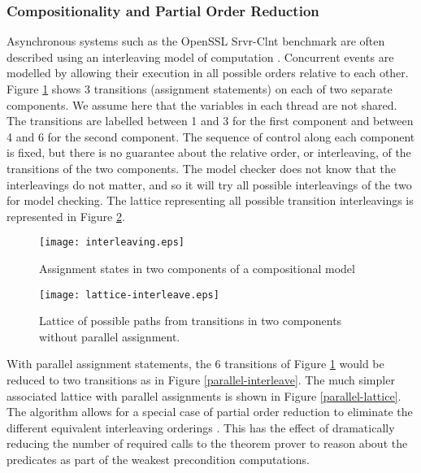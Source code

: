 \subsubsection{Compositionality and Partial Order Reduction}

Asynchronous systems such as the OpenSSL Srvr-Clnt benchmark are often
described using an interleaving model of
computation \cite{modelchecking}. Concurrent events are modelled by
allowing their execution in all possible orders relative to each
other.  Figure \ref{assignment-interleave} shows 3 transitions
(assignment statements) on each of two separate components.  We assume here that the variables in each thread are not shared.  The
transitions are labelled between 1 and 3 for the first component and
between 4 and 6 for the second component.  The sequence of control
along each component is fixed, but there is no guarantee about the
relative order, or interleaving, of the transitions of the two
components.  The model checker does not know that the interleavings do
not matter, and so it will try all possible interleavings of the two
for model checking.  The lattice representing all possible transition
interleavings is represented in Figure \ref{lattice-interleave}.

\begin{figure}
\begin{center}
\texttt{[image: interleaving.eps]}
\end{center}
\caption{Assignment states in two components of a compositional model}
\label{assignment-interleave}
\end{figure}

\begin{figure}
\begin{center}
\texttt{[image: lattice-interleave.eps]}
\end{center}
\caption{Lattice of possible paths from transitions in two components
  without parallel assignment.}
\label{lattice-interleave}
\end{figure}

With parallel assignment statements, the 6 transitions of Figure
\ref{assignment-interleave} would be reduced to two transitions as in
Figure \ref{parallel-interleave}.  The much simpler associated lattice
with parallel assignments is shown in Figure \ref{parallel-lattice}.
The \catomizer{} algorithm allows for a special case of partial order
reduction to eliminate the different equivalent interleaving
orderings \cite{partialorder}. This has the effect of dramatically
reducing the number of required calls to the theorem prover to reason
about the predicates as part of the weakest precondition computations.

